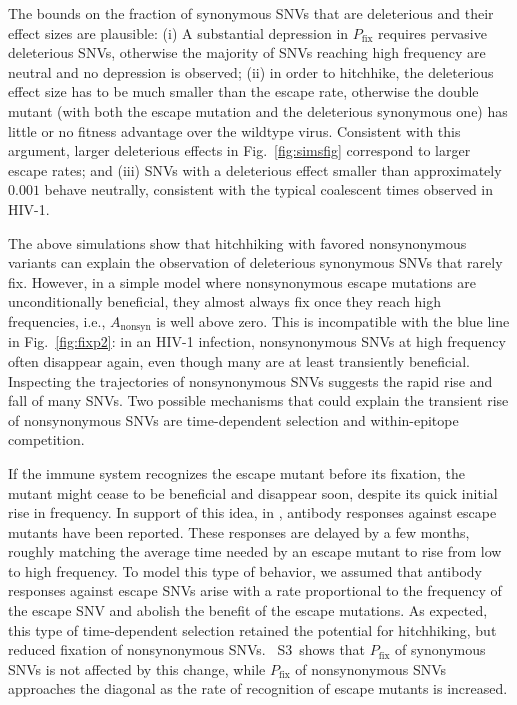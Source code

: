 \documentclass[rmp, twocolumn]{revtex4}
\newcommand{\pfix}{P_{\mathrm{fix}}}
\newcommand{\FIG}[1]{Fig.~\ref{fig:#1}}
\newcommand{\timedependence}{3}
\begin{document}
The bounds on the fraction of synonymous SNVs that are deleterious and
their effect sizes are plausible:
(i) A substantial depression in $\pfix$ requires pervasive deleterious SNVs, otherwise
the majority of SNVs reaching high frequency are neutral and no depression is
observed; (ii) in order to hitchhike, the deleterious effect size has to be much
smaller than the escape rate, otherwise the double mutant (with both the escape
mutation and the deleterious synonymous one) has little or no fitness advantage
over the wildtype virus. Consistent with this argument, larger deleterious
effects in \FIG{simsfig} correspond to larger escape rates; and (iii) SNVs
with a deleterious effect smaller than approximately $0.001$ behave neutrally,
consistent with the typical coalescent times observed in HIV-1.

The above simulations show that hitchhiking with favored nonsynonymous
variants can explain the observation of
deleterious synonymous SNVs that rarely fix. However, in a simple model where
nonsynonymous escape mutations are unconditionally beneficial, they almost
always fix once they reach high frequencies, i.e., $A_{\mathrm{nonsyn}}$ is well
above zero. This is incompatible with the blue line in \FIG{fixp2}: in an HIV-1
infection, nonsynonymous SNVs at high frequency often disappear again, even
though many are at least transiently beneficial. Inspecting the trajectories of
nonsynonymous SNVs suggests the rapid rise and fall of many SNVs. Two
possible mechanisms that could explain the transient rise of
nonsynonymous SNVs are time-dependent selection and within-epitope competition.

If the immune system
recognizes the escape mutant before its fixation, the mutant might cease to be
beneficial and disappear soon, despite its quick initial rise in frequency. In
support of this idea, in \citet{richman_rapid_2003, bunnik_autologous_2008},
antibody responses against escape mutants have been reported. These responses are
delayed by a few months, roughly matching the average time needed by an escape
mutant to rise from low to high frequency. To model this type of behavior, we
assumed that antibody responses against escape SNVs arise with a rate
proportional to the frequency of the escape SNV and abolish the benefit of the
escape mutations. As expected, this type of time-dependent selection retained the
potential for hitchhiking, but reduced fixation of nonsynonymous SNVs.
\figurename~S\timedependence~shows that $\pfix$ of synonymous SNVs is not
affected by this change, while $\pfix$ of nonsynonymous SNVs approaches the
diagonal as the rate of recognition of escape mutants is increased. 
\end{document}
